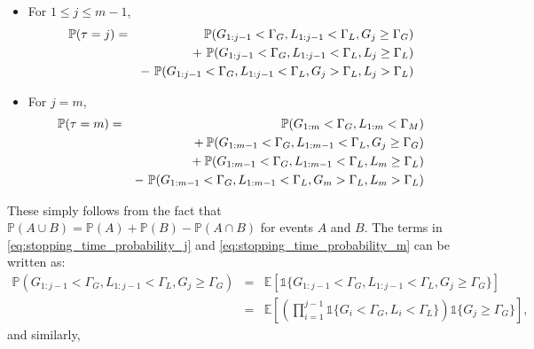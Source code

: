 \documentclass{article}
\begin{document}
\begin{itemize}
\item[] For $ 1 \leq j \leq m-1$,
\begin{eqnarray} 
\mathbb{P} ( \tau = j ) & = & \hspace{0.15in} \mathbb{P} ( G_{1:j-1} < \Gamma_{G}, L_{1:j-1} < \Gamma_{L}, G_{j} \geq \Gamma_{G} ) \nonumber \\
& & + \text{ } \mathbb{P} ( G_{1:j-1} < \Gamma_{G}, L_{1:j-1} < \Gamma_{L}, L_{j} \geq \Gamma_{L} ) \nonumber \\
& & - \text{ } \mathbb{P} ( G_{1:j-1} < \Gamma_{G}, L_{1:j-1} < \Gamma_{L}, G_{j} > \Gamma_{L}, L_{j} > \Gamma_{L} ) \label{eq:stopping_time_probability_j}
\end{eqnarray}

\item[] For $j = m$,
\begin{eqnarray}
\mathbb{P}(\tau = m) & = & \hspace{0.2in} \mathbb{P} ( G_{1:m} < \Gamma_{G}, L_{1:m} < \Gamma_{M} ) \nonumber \\
& & \text{ } + \mathbb{P} ( G_{1:m-1} < \Gamma_{G}, L_{1:m-1} < \Gamma_{L}, G_{j} \geq \Gamma_{G} ) \nonumber \\
& & \text{ } + \mathbb{P} ( G_{1:m-1} < \Gamma_{G}, L_{1:m-1} < \Gamma_{L}, L_{m} \geq \Gamma_{L} ) \nonumber \\
& & - \text{ } \mathbb{P} ( G_{1:m-1} < \Gamma_{G}, L_{1:m-1} < \Gamma_{L}, G_{m} > \Gamma_{L}, L_{m} > \Gamma_{L} ) \label{eq:stopping_time_probability_m}
\end{eqnarray}
\end{itemize}
These simply follows from the fact that $ \mathbb{P} (A \cup B) = \mathbb{P} (A) + \mathbb{P}(B) - \mathbb{P} (A \cap B)$ for events $A$ and $B$. The terms in \eqref{eq:stopping_time_probability_j} and \eqref{eq:stopping_time_probability_m} can be written as:
\begin{eqnarray} 
\mathbb{P} ( G_{1:j-1} < \Gamma_{G}, L_{1:j-1} < \Gamma_{L}, G_{j} \geq \Gamma_{G} ) & = & \mathbb{E} \left [ \mathds{1} \{ G_{1:j-1} < \Gamma_{G}, L_{1:j-1} < \Gamma_{L}, G_{j} \geq \Gamma_{G} \} \right ] \nonumber \\
& = & \mathbb{E} \left [ \left ( \prod_{i=1}^{j-1} \mathds{1} \{ G_{i} < \Gamma_{G}, L_{i} < \Gamma_{L} \} \right ) \mathds{1} \{ G_{j} \geq \Gamma_{G} \} \right ], \nonumber 
\end{eqnarray}
and similarly,
\end{document}
